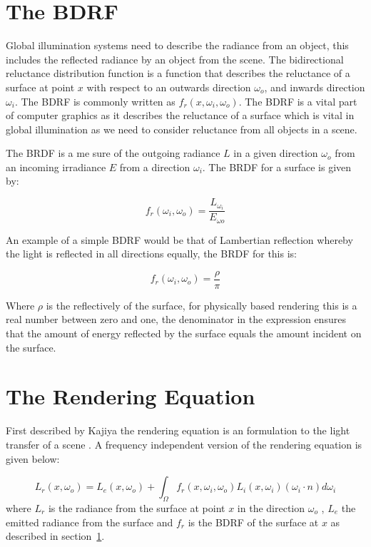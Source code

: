\section{The BDRF}
\label{sec:bdrf}
Global illumination systems need to describe the radiance from an object, this includes the
reflected radiance by an object from the scene.
The bidirectional reluctance distribution function \cite{Nicodemus65}is a function that describes 
the reluctance of a surface at point $x$ with respect to an outwards direction $\omega_{o}$, and 
inwards direction $\omega_{i}$. The BDRF is commonly written as $f_{r}(x, \omega_{i},\omega_{o})$. 
The BDRF is a vital part of computer graphics as it describes the reluctance of a surface which is 
vital in global illumination as we need to consider reluctance from all objects in a scene.

The BRDF is a me sure of the outgoing radiance $L$ in a given direction $\omega_{o}$ from an incoming
irradiance $E$ from a direction $\omega_{i}$. The BRDF for a surface is given by:

\begin{equation}
f_{r}(\omega_{i}, \omega_{o}) = \frac{L_{\omega_{i}}}{E_{\omega{o}}}
\end{equation}

An example of a simple BDRF would be that of Lambertian reflection whereby the light is reflected
in all directions equally, the BRDF for this is:

\begin{equation}
f_{r}(\omega_{i}, \omega_{o}) = \frac{\rho}{\pi}
\end{equation}

Where $\rho$ is the reflectively of the surface, for physically based rendering this is a real
number between zero and one, the denominator in the expression ensures that the amount of
energy reflected by the surface equals the amount incident on the surface.

\section{The Rendering Equation}
\label{sec:rendering_eq}
First described by Kajiya the rendering equation is an
formulation to the light transfer of a scene \cite{Kajiya86}. A frequency independent version of
the rendering equation is given below:

\begin{equation}
L_{r}(x, \omega_{o}) = L_{e}(x, \omega_{o})
					 +
					   \int_{\Omega}
					 		f_{r}(x, \omega_{i}, \omega_{o})
							L_i(x, \omega_{i})
							(\omega_{i} \cdot n)d\omega_{i}
\end{equation}
where $L_{r}$ is the radiance from the surface at point $x$  in the direction $\omega_o$ ,
$L_{e}$ the emitted radiance from the surface and $f_{r}$
is the BDRF of the surface at $x$ as described in section~\ref{sec:bdrf}.

